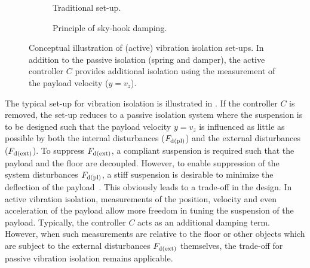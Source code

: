 \begin{figure}
 \centering
  \setlength{\figurewidth}{0.45\columnwidth}
  \begin{subfigure}[b]{0.49\columnwidth}
    
    \caption{Traditional set-up.}  
    \label{fig:lrmhinf:vibration-isolation:traditional}
  \end{subfigure}
  \begin{subfigure}[b]{0.49\columnwidth}
    
    \caption{Principle of sky-hook damping.}  
    \label{fig:lrmhinf:vibration-isolation:skyhook}
  \end{subfigure}
  \caption[Vibration isolation set-ups (traditional, sky-hook dampinng)]{Conceptual illustration of (active) vibration isolation set-ups. 
  In addition to the passive isolation (spring and damper), the active controller $C$ provides additional isolation using the measurement of the payload velocity ($y=v_z$).
  }
  \label{fig:lrmhinf:vibration-isolation}
\end{figure}

The typical set-up for vibration isolation is illustrated in .
If the controller $C$ is removed, the set-up reduces to a passive isolation system where the suspension is to be designed such that the payload velocity $y=v_z$ is influenced as little as possible by both the internal disturbances ($F_{\mathrm{d(pl)}}$) and the external disturbances ($F_{\mathrm{d(ext)}}$).
To suppress $F_{\mathrm{d(ext)}}$, a compliant suspension is required such that the payload and the floor are decoupled.
However, to enable suppression of the system disturbances $F_{\mathrm{d(pl)}}$, a stiff suspension is desirable to minimize the deflection of the payload~\citep{Voorhoeve2015SYSID}.
This obviously leads to a trade-off in the design.
In active vibration isolation, measurements of the position, velocity and even acceleration of the payload allow more freedom in tuning the suspension of the payload.
Typically, the controller $C$ acts as an additional damping term.
However, when such measurements are relative to the floor or other objects which are subject to the external disturbances $F_{\mathrm{d(ext)}}$ themselves, the trade-off for passive vibration isolation remains applicable.

